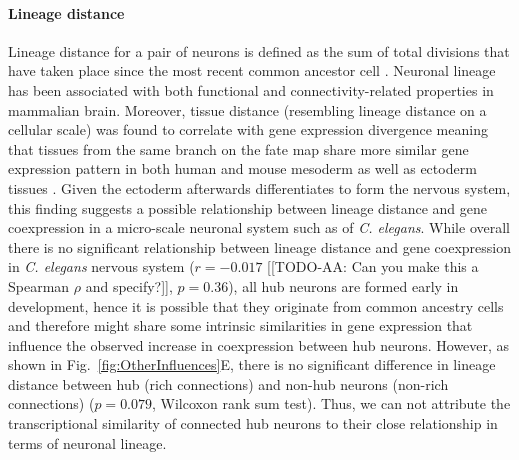 \documentclass[10pt,letterpaper]{article}
\begin{document}
\paragraph{Lineage distance}
Lineage distance for a pair of neurons is defined as the sum of total divisions that have taken place since the most recent common ancestor cell \cite{Pavlovic:2014gx, Sulston1977, Sulston1983}.
Neuronal lineage has been associated with both functional \cite{Ciceri2013, Li2012} and connectivity-related properties \cite{Yu2012} in mammalian brain.
Moreover, tissue distance (resembling lineage distance on a cellular scale) was found to correlate with gene expression divergence meaning that tissues from the same branch on the fate map share more similar gene expression pattern in both human and mouse mesoderm as well as ectoderm tissues \cite{Cui2007}.
Given the ectoderm afterwards differentiates to form the nervous system, this finding suggests a possible relationship between lineage distance and gene coexpression in a micro-scale neuronal system such as of \textit{C. elegans}.
While overall there is no significant relationship between lineage distance and gene coexpression in \textit{C. elegans} nervous system ($r = -0.017$ [[TODO-AA: Can you make this a Spearman $\rho$ and specify?]], $p = 0.36$), all hub neurons are formed early in development, hence it is possible that they originate from common ancestry cells and therefore might share some intrinsic similarities in gene expression that influence the observed increase in coexpression between hub neurons.
However, as shown in Fig.~\ref{fig:OtherInfluences}E, there is no significant difference in lineage distance between hub (rich connections) and non-hub neurons (non-rich connections) ($p = 0.079$, Wilcoxon rank sum test).
Thus, we can not attribute the transcriptional similarity of connected hub neurons to their close relationship in terms of neuronal lineage.
\end{document}
